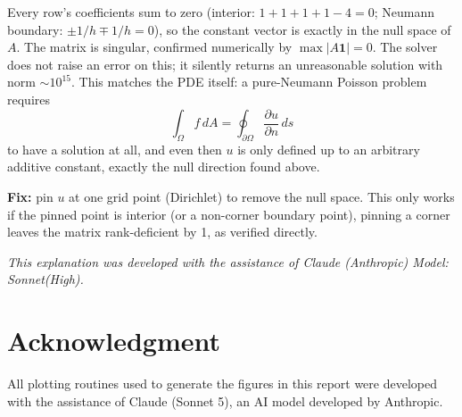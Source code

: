 \documentclass[12pt]{article}
\begin{document}
Every row's coefficients sum to zero (interior: $1+1+1+1-4=0$; Neumann boundary: $\pm 1/h \mp 1/h = 0$), so the constant vector is exactly in the null space of $A$. The matrix is singular, confirmed numerically by $\max |A\mathbf{1}| = 0$. The solver does not raise an error on this; it silently returns an unreasonable solution with norm $\sim 10^{15}$. This matches the PDE itself: a pure-Neumann Poisson problem requires
\begin{equation}
    \int_\Omega f \, dA = \oint_{\partial\Omega} \frac{\partial u}{\partial n} \, ds
\end{equation}
to have a solution at all, and even then $u$ is only defined up to an arbitrary additive constant, exactly the null direction found above.

\textbf{Fix:} pin $u$ at one grid point (Dirichlet) to remove the null space. This only works if the pinned point is interior (or a non-corner boundary point), pinning a corner leaves the matrix rank-deficient by 1, as verified directly.

\textit{This explanation was developed with the assistance of Claude (Anthropic) Model: Sonnet(High).}


\section*{Acknowledgment}
All plotting routines used to generate the figures in this report were developed with the assistance of Claude (Sonnet 5), an AI model developed by Anthropic.
\end{document}
